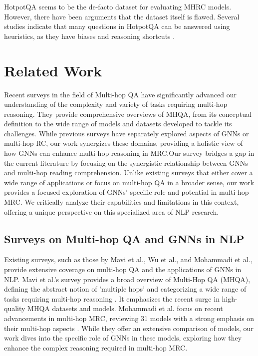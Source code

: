 \documentclass[sigplan,screen,nonacm]{acmart}
\begin{document}
HotpotQA seems to be the de-facto dataset for evaluating MHRC models. However, there have been arguments that the dataset itself is flawed. 
Several studies \cite{RN176} \cite{RN175} \cite{RN154} \cite{RN150} indicate that many questions in HotpotQA can be answered using heuristics, 
as they have biases and reasoning shortcuts \cite{RN177}.



\section{Related Work}
Recent surveys in the field of Multi-hop QA have significantly advanced our understanding of the complexity and variety of tasks requiring multi-hop reasoning. 
They provide comprehensive overviews of MHQA, from its conceptual definition to the wide range of models and datasets developed to tackle its challenges. 
While previous surveys have separately explored aspects of GNNs or multi-hop RC, our work synergizes these domains, providing a holistic view 
of how GNNs can enhance multi-hop reasoning in MRC.Our survey bridges a gap in the current literature by focusing on the synergistic relationship 
between GNNs and multi-hop reading comprehension. Unlike existing surveys that either cover a wide range of applications or focus on multi-hop QA 
in a broader sense, our work provides a focused exploration of GNNs' specific role and potential in multi-hop MRC. We critically analyze their
capabilities and limitations in this context, offering a unique perspective on this specialized area of NLP research. 

\subsection{Surveys on Multi-hop QA and GNNs in NLP}
Existing surveys, such as those by Mavi et al., Wu et al., and Mohammadi et al., provide extensive coverage on multi-hop QA and the applications 
of GNNs in NLP. Mavi et al.'s survey provides a broad overview of Multi-Hop QA (MHQA), defining the abstract notion of 'multiple hops' and categorizing 
a wide range of tasks requiring multi-hop reasoning \cite{RN165}. It emphasizes the recent surge in high-quality MHQA datasets and models. 
Mohammadi et al. focus on recent advancements in multi-hop MRC, reviewing 31 models with a strong emphasis on their multi-hop aspects \cite{RN80}. 
While they offer an extensive comparison of models, our work dives into the specific role of GNNs in these models, exploring how they enhance 
the complex reasoning required in multi-hop MRC.
\end{document}
